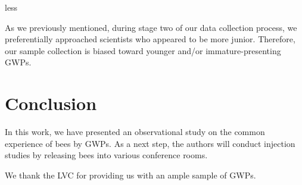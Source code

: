 less\documentclass[aps,prl,preprint,groupedaddress,twocolumn]{revtex4-1}
\begin{document}
As we previously mentioned, during stage two of our data collection process,
we preferentially approached scientists who appeared to be more junior.
Therefore, our sample collection is biased toward younger and/or
immature-presenting GWPs.

\section{Conclusion}

In this work, we have presented an observational study on the common
experience of bees by GWPs. As a next step, the authors will conduct
injection studies by releasing bees into various conference rooms.

We thank the LVC for providing us with an ample sample of GWPs.




%
\end{document}
